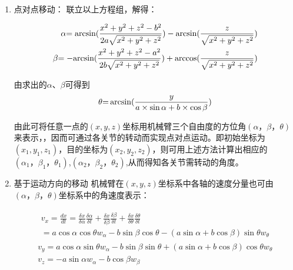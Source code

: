 \begin{enumerate}
\item 点对点移动：
联立以上方程组，解得：

\begin{align}
\alpha {\rm{ = arcsin(}}\frac{{{x^2} + {y^2} + {z^2} - {b^2}}}{{2a\sqrt {{x^2} + {y^2} + {z^2}} }}) - {\rm{arcsin(}}\frac{z}{{\sqrt {{x^2} + {y^2} + {z^2}} }})\\
\beta {\rm{ =  - arcsin(}}\frac{{{x^2} + {y^2} + {z^2} - {a^2}}}{{2b\sqrt {{x^2} + {y^2} + {z^2}} }}) + {\rm{arccos(}}\frac{z}{{\sqrt {{x^2} + {y^2} + {z^2}} }})
\end{align}

由求出的$\alpha$、$\beta$可得到
\begin{equation}
\theta {\rm{ = }}\arcsin (\frac{y}{{a \times \sin \alpha  + b \times \cos \beta }})
\end{equation}

由此可将任意一点的$(x,y,z)$坐标用机械臂三个自由度的方位角$(\alpha，\beta，\theta)$来表示，，因而可通过各关节的转动而实现点对点运动。即初始坐标为$(x_1,y_1,z_1)$，目的坐标为$(x_2,y_2,z_2)$，则可用上述方法计算出相应的$(\alpha_1，\beta_1，\theta_1)$,$(\alpha_2，\beta_2，\theta_2)$,从而得知各关节需转动的角度。

\item 基于运动方向的移动
机械臂在$(x,y,z)$坐标系中各轴的速度分量也可由$(\alpha，\beta，\theta)$坐标系中的角速度表示：

\begin{align}
\begin{array}{l}
{v_x} = \frac{{dx}}{{dt}} = \frac{{\delta x}}{{\delta \alpha }}\frac{{\delta \alpha }}{{\delta t}} + \frac{{\delta x}}{{\delta \beta }}\frac{{\delta \beta }}{{\delta t}} + \frac{{\delta x}}{{\delta \theta }}\frac{{\delta \theta }}{{\delta t}} \\= a\cos \alpha \cos \theta {w_\alpha } - b\sin \beta \cos \theta  - (a\sin \alpha  + b\cos \beta )\sin \theta {w_\theta }\end{array}\\
{v_y} = a\cos \alpha \sin \theta {w_\alpha } - b\sin \beta \sin \theta  + (a\sin \alpha  + b\cos \beta )\cos \theta {w_\theta }\\
{v_z} =  - a\sin \alpha {w_\alpha } - b\cos \beta {w_\beta }
\end{align}


\end{enumerate}
